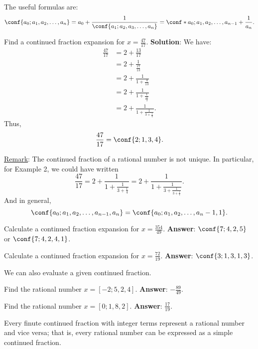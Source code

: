 The useful formulas are:
\[ \conf{a_0;a_1,a_2,\ldots,a_n}=a_0+\frac{1}{\conf{a_1;a_2,a_3,\ldots,a_n}}
    =\conf*{a_0;a_1,a_2,\ldots,a_{n-1}+\frac{1}{a_n}}. \]
\begin{Example}{}{}
    Find a continued fraction expansion for $ x=\frac{47}{17} $.
    \tcblower{}
    \textbf{Solution}:
    We have:
    \begin{align*}
        \frac{47}{17}
         & =2+\frac{13}{17}                        \\
         & =2+\frac{1}{\frac{17}{13}}              \\
         & =2+\frac{1}{1+\frac{4}{13}}             \\
         & =2+\frac{1}{1+\frac{1}{\frac{13}{4}}}   \\
         & =2+\frac{1}{1+\frac{1}{3+\frac{1}{4}}}.
    \end{align*}
    Thus,
    \[ \frac{47}{17}=\conf{2;1,3,4}. \]
\end{Example}
\underline{Remark}: The continued fraction
of a rational number is not unique.
In particular, for Example 2, we could have written
\[ \frac{47}{17}=2+\frac{1}{1+\frac{1}{3+\frac{1}{4}}}=2+\frac{1}{1+\frac{1}{3+\frac{1}{3+\frac{1}{1}}}}. \]
And in general,
\[ \conf{a_0;a_1,a_2,\ldots,a_{n-1},a_n}=
    \conf{a_0;a_1,a_2,\ldots,a_n-1,1}. \]
\begin{Exercise}{}{}
    Calculate a continued fraction expansion
    for $ x=\frac{354}{49} $.
    \tcblower{}
    \textbf{Answer}: $ \conf{7;4,2,5} $ or $ \conf{7;4,2,4,1} $.
\end{Exercise}
\begin{Exercise}{}{}
    Calculate a continued fraction expansion
    for $ x=\frac{72}{19} $.
    \tcblower{}
    \textbf{Answer}: $ \conf{3;1,3,1,3} $.
\end{Exercise}
We can also evaluate a given continued fraction.
\begin{Example}{}{}
    Find the rational number $ x=[-2;5,2,4] $.
    \tcblower{}
    \textbf{Answer}: $ -\frac{89}{49} $.
\end{Example}
\begin{Exercise}{}{}
    Find the rational number $ x=[0;1,8,2] $.
    \tcblower{}
    \textbf{Answer}: $ \frac{17}{19} $.
\end{Exercise}
\begin{Proposition}{}{}
    Every finute continued fraction with integer terms represent a rational
    number and vice versa; that is,
    every rational number can be expressed as a simple continued fraction.
\end{Proposition}

